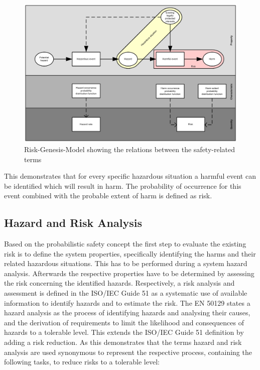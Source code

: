 \documentclass{template/openetcs_report}
\begin{document}
\begin{figure}[htbp]
\centering
\includegraphics[width=0.8\linewidth]{bld_2013-06-19_Risiko-Genese-Modell-eng-2-0_jw}
\caption{Risk-Genesis-Model showing the relations between the safety-related terms \cite{Schnieder.2010}}
\label{fig:Risiko-Genese-Modell-eng}
\end{figure}

This demonstrates that for every specific hazardous situation a harmful event can be identified which will result in harm. The probability of occurrence for this event combined with the probable extent of harm is defined as risk.

\subsection{Hazard and Risk Analysis}
\label{sec:HandR-Ana}

Based on the probabilistic safety concept the first step to evaluate the existing risk is to define the system properties, specifically identifying the harms and their related hazardous situations. This has to be performed during a system hazard analysis. Afterwards the respective properties have to be determined by assessing the risk concerning the identified hazards. Respectively, a risk analysis and assessment is defined in the ISO/IEC Guide 51 as a systematic use of available information to identify hazards and to estimate the risk. The EN 50129 states a hazard analysis as the process of identifying hazards and analysing their causes, and the derivation of requirements to limit the likelihood and consequences of hazards to a tolerable level. This extends the ISO/IEC Guide 51 definition by adding a risk reduction. As this demonstrates that the terms hazard and risk analysis are used synonymous to represent the respective process, containing the following tasks, to reduce risks to a tolerable level:
\end{document}
